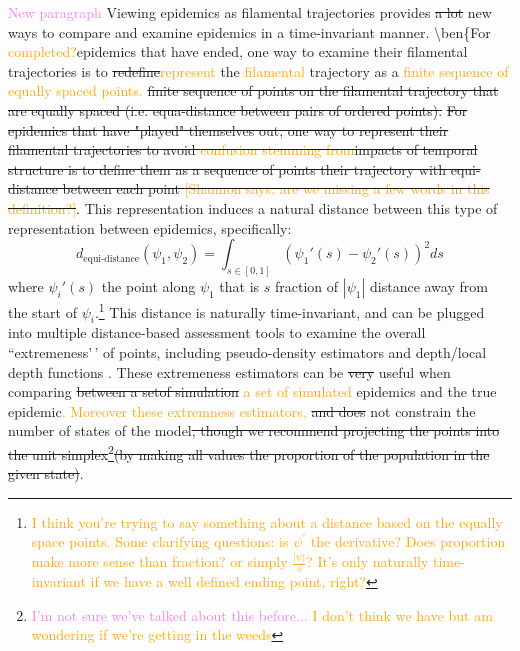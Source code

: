 \documentclass[
  shortnames]{jss}
\begin{document}
\textcolor{violet}{New paragraph} Viewing epidemics as filamental
trajectories provides \sout{a lot }new ways to compare and examine
epidemics in a time-invariant manner. \textbackslash ben\{For
\textcolor{orange}{completed?}epidemics that have ended, one way to
examine their filamental trajectories is to
\sout{redefine}\textcolor{orange}{represent} the
\textcolor{orange}{filamental} trajectory as a
\textcolor{orange}{finite sequence of equally spaced points.}
\sout{finite sequence of points on the filamental trajectory that are equally spaced (i.e. equa-distance between pairs of ordered points).}
\sout{For epidemics that have "played" themselves out, one way to represent their filamental trajectories to avoid \textcolor{orange}{confusion stemming from}\sout{impacts of} temporal structure is to define them as a sequence of points their trajectory with equi-distance between each point \textcolor{orange}{[Shannon says: are we missing a few words in this definition?]}}.
This representation induces a natural distance between this type of
representation between epidemics, specifically: \[
d_\text{equi-distance}(\psi_1, \psi_2)  = \int_{s \in [0,1]} (\psi_1'(s) - \psi_2'(s))^2 ds
\] where \(\psi_i'(s)\) the point along \(\psi_1\) that is \(s\)
fraction of \(|\psi_1|\) distance away from the start of
\(\psi_i\).\footnote{\textcolor{orange}{I think you're trying to say something about a distance based on the equally space points.  Some clarifying questions:  is $\psi^\prime$ the derivative?  Does proportion make more sense than fraction? or simply $\frac{|\psi|}{s}$? It's only naturally time-invariant if we have a well defined ending point, right?}}
This distance is naturally time-invariant, and can be plugged into
multiple distance-based assessment tools to examine the overall
``extremeness'\,' of points, including pseudo-density estimators and
depth/local depth functions
\citep[for examples see][]{Ciollaro2016, Geenens2017}. These extremeness
estimators can be \sout{very} useful when comparing
\sout{between a setof simulation} \textcolor{orange}{a set of simulated}
epidemics and the true
epidemic\textcolor{orange}{. Moreover these extremness estimators,}
\sout{and does} \textcolor{orange}{} not constrain the number of states
of the
model\sout{, though we recommend projecting the points into the unit simplex}\footnote{\textcolor{violet}{I'm not sure we've talked about this before... \textcolor{orange}{I don't think we have but am wondering if we're getting in the weeds}}}\sout{(by making all values the proportion of the population in the given state)}.
\end{document}
